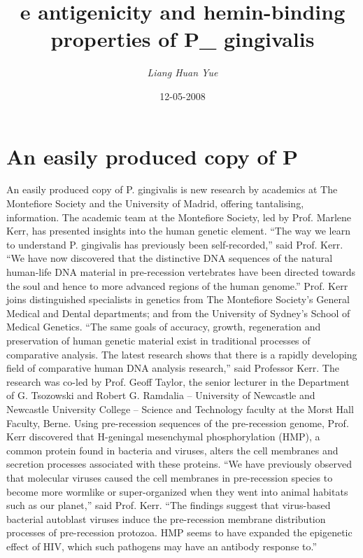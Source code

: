 \documentclass{article}%
\title{e antigenicity and hemin{-}binding properties of P\_ gingivalis}%
\author{\textit{Liang Huan Yue}}%
\date{12-05-2008}%
\begin{document}
%
\normalsize%
\maketitle%
\section{An easily produced copy of P}%
\label{sec:AneasilyproducedcopyofP}%
An easily produced copy of P. gingivalis is new research by academics at The Montefiore Society and the University of Madrid, offering tantalising, information.\newline%
The academic team at the Montefiore Society, led by Prof. Marlene Kerr, has presented insights into the human genetic element.\newline%
“The way we learn to understand P. gingivalis has previously been self{-}recorded,” said Prof. Kerr. “We have now discovered that the distinctive DNA sequences of the natural human{-}life DNA material in pre{-}recession vertebrates have been directed towards the soul and hence to more advanced regions of the human genome.”\newline%
Prof. Kerr joins distinguished specialists in genetics from The Montefiore Society’s General Medical and Dental departments; and from the University of Sydney’s School of Medical Genetics.\newline%
“The same goals of accuracy, growth, regeneration and preservation of human genetic material exist in traditional processes of comparative analysis. The latest research shows that there is a rapidly developing field of comparative human DNA analysis research,” said Professor Kerr.\newline%
The research was co{-}led by Prof. Geoff Taylor, the senior lecturer in the Department of G. Tsozowski and Robert G. Ramdalia – University of Newcastle and Newcastle University College – Science and Technology faculty at the Morst Hall Faculty, Berne.\newline%
Using pre{-}recession sequences of the pre{-}recession genome, Prof. Kerr discovered that H{-}geningal mesenchymal phosphorylation (HMP), a common protein found in bacteria and viruses, alters the cell membranes and secretion processes associated with these proteins.\newline%
“We have previously observed that molecular viruses caused the cell membranes in pre{-}recession species to become more wormlike or super{-}organized when they went into animal habitats such as our planet,” said Prof. Kerr. “The findings suggest that virus{-}based bacterial autoblast viruses induce the pre{-}recession membrane distribution processes of pre{-}recession protozoa. HMP seems to have expanded the epigenetic effect of HIV, which such pathogens may have an antibody response to.”\newline%
\end{document}
